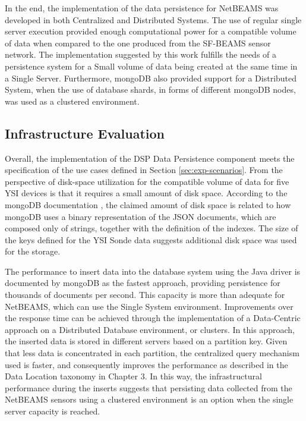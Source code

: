 In the end, the implementation of the data persistence for NetBEAMS was
developed in both Centralized and Distributed Systems. The use of regular single
server execution provided enough computational power for a compatible volume of
data when compared to the one produced from the SF-BEAMS sensor network. The
implementation suggested by this work fulfills the needs of a persistence system
for a Small volume of data being created at the same time in a Single Server.
Furthermore, mongoDB also provided support for a Distributed System, when the
use of database shards, in forms of different mongoDB nodes, was used as a 
clustered environment.

\subsection{Infrastructure Evaluation}

Overall, the implementation of the DSP Data Persistence component meets the
specification of the use cases defined in Section \ref{sec:exp-scenarios}.
From the perspective of disk-space utilization for the compatible volume of
data for five YSI devices is that it requires a small amount of disk space.
According to the mongoDB documentation \cite{mongodb}, the claimed amount of
disk space is related to how mongoDB uses a binary representation of the JSON
documents, which are composed only of strings, together with the definition of
the indexes. The size of the keys defined for the YSI Sonde data suggests
additional disk space was used for the storage.

The performance to insert data into the database system using the Java driver
is documented by mongoDB as the fastest approach, providing persistence for
thousands of documents per second. This capacity is more than adequate for
NetBEAMS, which can use the Single System environment. Improvements over the
response time can be achieved through the implementation of a Data-Centric
approach on a Distributed Database environment, or clusters. In this approach,
the inserted data is stored in different servers based on a partition key.
Given that less data is concentrated in each partition, the centralized query
mechanism used is faster, and consequently improves the performance as
described in the Data Location taxonomy in Chapter 3. In this way, the
infrastructural performance during the inserts suggests that persisting data
collected from the NetBEAMS sensors using a clustered environment is an option
when the single server capacity is reached.


